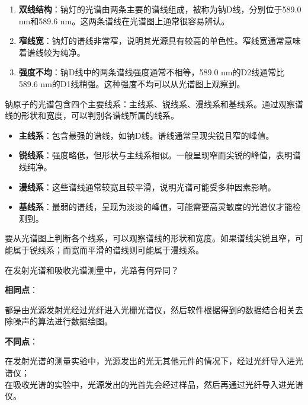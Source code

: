 \documentclass[dvipsnames, svgnames,a4paper,11pt]{article}
\begin{document}
\begin{enumerate}
    \item \textbf{双线结构}：钠灯的光谱由两条主要的谱线组成，被称为钠D线，分别位于589.0 nm和589.6 nm。这两条谱线在光谱图上通常很容易辨认。

    \item \textbf{窄线宽}：钠灯的谱线非常窄，说明其光源具有较高的单色性。窄线宽通常意味着谱线较为纯净。

    \item \textbf{强度不均}：钠D线中的两条谱线强度通常不相等，589.0 nm的D2线通常比589.6 nm的D1线稍强。这种强度不均可以从光谱图上观察到。
\end{enumerate}

钠原子的光谱包含四个主要线系：主线系、锐线系、漫线系和基线系。通过观察谱线的形状和宽度，可以判别各谱线所属的线系。

\begin{itemize}
    \item \textbf{主线系}：包含最强的谱线，如钠D线。谱线通常呈现尖锐且窄的峰值。

    \item \textbf{锐线系}：强度略低，但形状与主线系相似。一般呈现窄而尖锐的峰值，表明谱线纯净。

    \item \textbf{漫线系}：这些谱线通常较宽且较平滑，说明光谱可能受多种因素影响。

    \item \textbf{基线系}：最弱的谱线，呈现为淡淡的峰值，可能需要高灵敏度的光谱仪才能检测到。
\end{itemize}

要从光谱图上判断各个线系，可以观察谱线的形状和宽度。如果谱线尖锐且窄，可能属于锐线系；而宽而平滑的谱线则可能属于漫线系。

	\begin{question}
		在发射光谱和吸收光谱测量中，光路有何异同？
	\end{question}
	\textbf{相同点}：
	
		都是由光源发射光经过光纤进入光栅光谱仪，然后软件根据得到的数据结合相关去除噪声的算法进行数据绘图。
	
		
	
	
	\textbf{不同点}：
	
	在发射光谱的测量实验中，光源发出的光无其他元件的情况下，经过光纤导入进光谱仪；\\
		在吸收光谱的实验中，光源发出的光首先会经过样品，然后再通过光纤导入进光谱仪。
		
		
	
\end{document}
